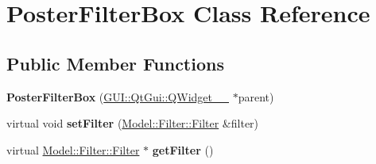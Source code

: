 \hypertarget{classGUI_1_1PosterFilterBox}{}\section{Poster\+Filter\+Box Class Reference}
\label{classGUI_1_1PosterFilterBox}
\subsection*{Public Member Functions}
\begin{DoxyCompactItemize}
\item 
\hypertarget{classGUI_1_1PosterFilterBox_adf0695b68fe68bc89275fea4168d796c}{}{\bfseries Poster\+Filter\+Box} (\hyperlink{classGUI_1_1QtGui_1_1QWidget____10}{G\+U\+I\+::\+Qt\+Gui\+::\+Q\+Widget\+\_\+\+\_} $\ast$parent)\label{classGUI_1_1PosterFilterBox_adf0695b68fe68bc89275fea4168d796c}

\item 
\hypertarget{classGUI_1_1PosterFilterBox_ad7c0ee00fe3faac7942d75eec2a5342b}{}virtual void {\bfseries set\+Filter} (\hyperlink{classModel_1_1Filter_1_1Filter}{Model\+::\+Filter\+::\+Filter} \&filter)\label{classGUI_1_1PosterFilterBox_ad7c0ee00fe3faac7942d75eec2a5342b}

\item 
\hypertarget{classGUI_1_1PosterFilterBox_acef2029a93f4ab3a538cdb643b9c2613}{}virtual \hyperlink{classModel_1_1Filter_1_1Filter}{Model\+::\+Filter\+::\+Filter} $\ast$ {\bfseries get\+Filter} ()\label{classGUI_1_1PosterFilterBox_acef2029a93f4ab3a538cdb643b9c2613}

\end{DoxyCompactItemize}
